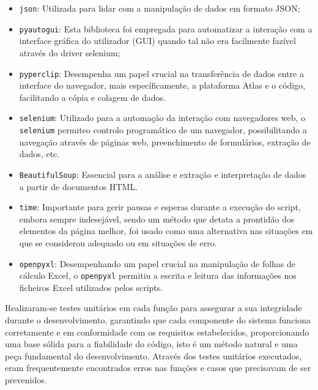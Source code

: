                 \begin{itemize}
                    \item \texttt{json}: Utilizada para lidar com a manipulação de dados em formato JSON;

                    \item \texttt{pyautogui}: Esta biblioteca foi empregada para automatizar a interação com a interface gráfica do utilizador (GUI) quando tal não era facilmente fazível através do driver selenium;
                    
                    \item \texttt{pyperclip}: Desempenha um papel crucial na transferência de dados entre a interface do navegador, mais específicamente, a plataforma Atlas e o código, facilitando a cópia e colagem de dados.
                    
                    \item \texttt{selenium}: Utilizado para a automação da interação com navegadores web, o \texttt{selenium} permiteo controlo programático de um navegador, possibilitando a navegação através de páginas web, preenchimento de formulários,  extração de dados, etc.
                    
                    \item \texttt{BeautifulSoup}: Essencial para a análise e extração e interpretação de dados a partir de documentos HTML.
                    
                    \item \texttt{time}: Importante para gerir pausas e esperas durante a execução do script, embora sempre indesejável, sendo um método que detata a prontidão dos elementos da página melhor, foi usado como uma alternativa nas situações em que se considerou adequado ou em situações de erro.
                    
                    \item \texttt{openpyxl}: Desempenhando um papel crucial na manipulação de folhas de cálculo Excel, o \texttt{openpyxl} permitiu a escrita e leitura das informações nos ficheiros Excel utilizados pelos scripts.
                \end{itemize}

            \label{secsecsec:testes_validacoes_python}

                Realizaram-se testes unitários em cada função para assegurar a sua integridade durante o desenvolvimento, garantindo que cada componente do sistema funciona corretamente e em conformidade com os requisitos estabelecidos, proporcionando uma base sólida para a fiabilidade do código, isto é um método natural e uma peça fundamental do desenvolvimento. Através dos testes unitários executados, eram frequentemente encontrados erros nas funções e casos que precisavam de ser prevenidos.
            
